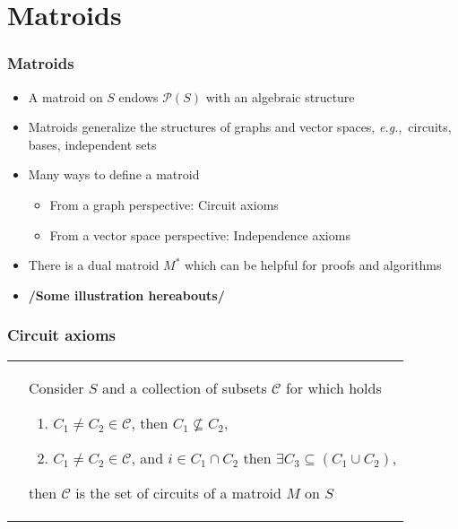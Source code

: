 \documentclass[bigger]{beamer}
\newcommand{\eg}{{\em e.g.},~}
\begin{document}
\section{Matroids}



\begin{frame}
\frametitle{Matroids}
\begin{itemize}


\item A matroid on $S$ endows $\mathcal{P}(S)$ with an algebraic
  structure 
\item Matroids generalize the structures of graphs and vector spaces,
  \eg circuits, bases, independent sets
\item Many ways to define a matroid
  \begin{itemize}
  \item From a graph perspective: Circuit axioms
  \item From a vector space perspective: Independence axioms
  \end{itemize}
\item There is a dual matroid $M^*$ which can be helpful for proofs and algorithms 
\item \textbf{/Some illustration hereabouts/}
\end{itemize} %
\end{frame}



\begin{frame}
\frametitle{Circuit axioms}


\begin{tabular}{ll}
  \begin{minipage}{.4\textwidth}
    
  \end{minipage} &
  \begin{minipage}{.6\textwidth}
    Consider $S$ and a collection of subsets $\mathscr{C}$ for which holds
    \begin{enumerate}
    \item $C_1 \neq C_2 \in \mathscr{C}$, then $C_1 \nsubseteq C_2$,
    \item $C_1 \neq C_2 \in \mathscr{C}$, and $i \in C_1 \cap C_2$ then
      $\exists C_3 \subseteq (C_1 \cup C_2)$,
    \end{enumerate}
    then $\mathscr{C}$ is the set of circuits of a matroid $M$ on $S$
  \end{minipage}
\end{tabular}



\end{frame}
\end{document}
